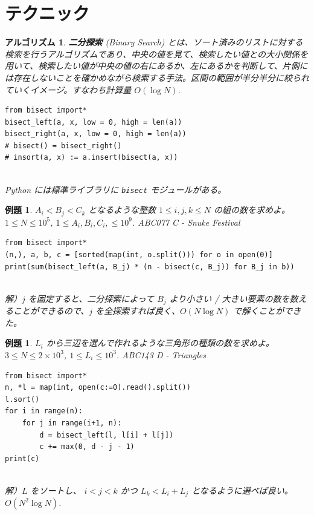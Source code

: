 \documentclass[12pt, a4j]{ltjsarticle}
\newtheorem{alg}[thm]{アルゴリズム}
\newtheorem{exm}[thm]{例題}
\begin{document}
\section{テクニック}
\begin{alg}{\bf 二分探索} (Binary Search) とは、ソート済みのリストに対する検索を行うアルゴリズムであり、中央の値を見て、検索したい値との大小関係を用いて、検索したい値が中央の値の右にあるか、左にあるかを判断して、片側には存在しないことを確かめながら検索する手法。区間の範囲が半分半分に絞られていくイメージ。すなわち計算量 $O(\log N)$.\\\upshape
\begin{lstlisting}
from bisect import*
bisect_left(a, x, low = 0, high = len(a))
bisect_right(a, x, low = 0, high = len(a))
# bisect() = bisect_right()
# insort(a, x) := a.insert(bisect(a, x))
\end{lstlisting}
\quad\\ Python には標準ライブラリに \lstinline{bisect} モジュールがある。
\end{alg}

\vspace{1.5cm}

\begin{exm} $A_i < B_j < C_k$ となるような整数 $1\le i,j,k \le N$ の組の数を求めよ。$1 \le N \le 10^5$, $1 \le A_i, B_i, C_i, \le 10^9$. \upshape ABC077 C - Snuke Festival\\
\begin{lstlisting}
from bisect import*
(n,), a, b, c = [sorted(map(int, o.split())) for o in open(0)]
print(sum(bisect_left(a, B_j) * (n - bisect(c, B_j)) for B_j in b))
\end{lstlisting}\quad\\
解）$j$ を固定すると、二分探索によって $B_j$ より小さい / 大きい要素の数を数えることができるので、$j$ を全探索すれば良く、$O(N\log N)$ で解くことができた。
\end{exm}

\vspace{1cm}

\begin{exm} $L_i$ から三辺を選んで作れるような三角形の種類の数を求めよ。$3 \le N \le 2 \times 10^3$, $1 \leq L_i \leq 10^3$. \upshape ABC143 D - Triangles\\
\begin{lstlisting}
from bisect import*
n, *l = map(int, open(c:=0).read().split())
l.sort()
for i in range(n):
    for j in range(i+1, n):
        d = bisect_left(l, l[i] + l[j])
        c += max(0, d - j - 1)
print(c)
\end{lstlisting}\quad\\
解）$L$ をソートし、 $i < j < k$ かつ $L_k < L_i + L_j$ となるように選べば良い。 $O(N^2\log N)$.
\end{exm}
\end{document}
